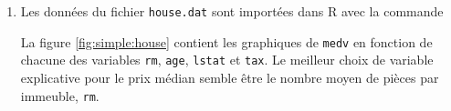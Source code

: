 \begin{solution}{2.17}

    \begin{enumerate}
    \item Les données du fichier \texttt{house.dat} sont importées
      dans \textsf{R} avec la commande
\begin{knitrout}
\color{fgcolor}\begin{kframe}
\begin{alltt}
 \hlkwb{<-} \hlstd{(}\hlstd{,}  \hlstd{=} \hlstd{)}
\end{alltt}
\end{kframe}
\end{knitrout}
      La figure \ref{fig:simple:house} contient les graphiques de
      \texttt{medv} en fonction de chacune des variables \texttt{rm},
      \texttt{age}, \texttt{lstat} et \texttt{tax}. Le meilleur choix
      de variable explicative pour le prix médian semble être le
      nombre moyen de pièces par immeuble, \texttt{rm}.
      \begin{figure}
\begin{knitrout}
\color{fgcolor}\begin{kframe}
\begin{alltt}
 \hlopt{~}  \hlopt{+}  \hlopt{+}  \hlopt{+}     \hlstd{=} \hlstd{)}
\end{alltt}
\end{kframe}


\end{knitrout}
\end{figure}
\end{enumerate}
\end{solution}
